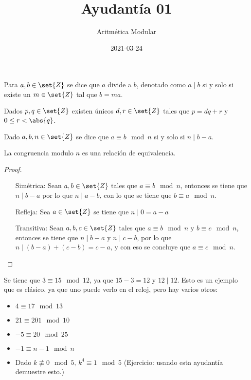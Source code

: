\documentclass{ayudantia}
\title{Ayudantía 01}
\subtitle{Aritmética Modular}
\date{2021-03-24}
\begin{document}
\maketitle
\begin{defn}[Divisibilidad]
    Para \(a,b\in\set{Z}\) se dice que \(a\) divide a \(b\), denotado como \(a\mid b\) si y solo si existe un \(m\in\set{Z}\) tal que \(b=ma\).
\end{defn}

\begin{thm}
    Dados \(p,q\in\set{Z}\) existen únicos \(d,r\in\set{Z}\) tales que \(p=dq+r\) y \(0\leq r<\abs{q}\).
\end{thm}

\begin{defn}
    Dado \(a,b,n\in\set{Z}\) se dice que \(a\equiv b\mod n\) si y solo si \(n\mid b-a\).
\end{defn}
\begin{thm}
    La congruencia modulo \(n\) es una relación de equivalencia.
\end{thm}
\begin{proof}\
    \begin{itemize}
        \item[Simétrica:] Sean \(a,b\in\set{Z}\) tales que \(a\equiv b\mod n\), entonces se tiene que \(n\mid b-a\) por lo que \(n\mid a-b\), con lo que se tiene que \(b\equiv a\mod n\).
        \item[Refleja:] Sea \(a\in\set{Z}\) se tiene que \(n\mid 0=a-a\)
        \item[Transitiva:] Sean \(a,b,c\in\set{Z}\) tales que \(a\equiv b\mod n\) y \(b\equiv c\mod n\), entonces se tiene que \(n\mid b-a\) y \(n\mid c-b\), por lo que \(n\mid (b-a)+(c-b)=c-a\), y con eso se concluye que \(a\equiv c\mod n\). 
    \end{itemize}
\end{proof}


\begin{ejm}
    Se tiene que \(3\equiv 15\mod 12\), ya que \(15-3=12\) y \(12\mid 12\). Esto es un ejemplo que es clásico, ya que uno puede verlo en el reloj, pero hay varios otros:
    \begin{itemize}
        \item \(4\equiv 17\mod 13\)
        \item \(21\equiv 201\mod 10\)
        \item \(-5\equiv 20\mod 25\)
        \item \(-1\equiv n-1\mod n\)
        \item Dado \(k\not\equiv 0\mod 5\), \(k^4\equiv 1\mod 5\) (Ejercicio: usando esta ayudantía demuestre esto.)
    \end{itemize}
\end{ejm}
\end{document}

